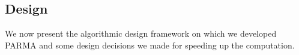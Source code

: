 
\subsection{Design}\label{subsec:parmadesign}
We now present the algorithmic design framework on which we developed PARMA and some design
decisions we made for speeding up the computation. 

